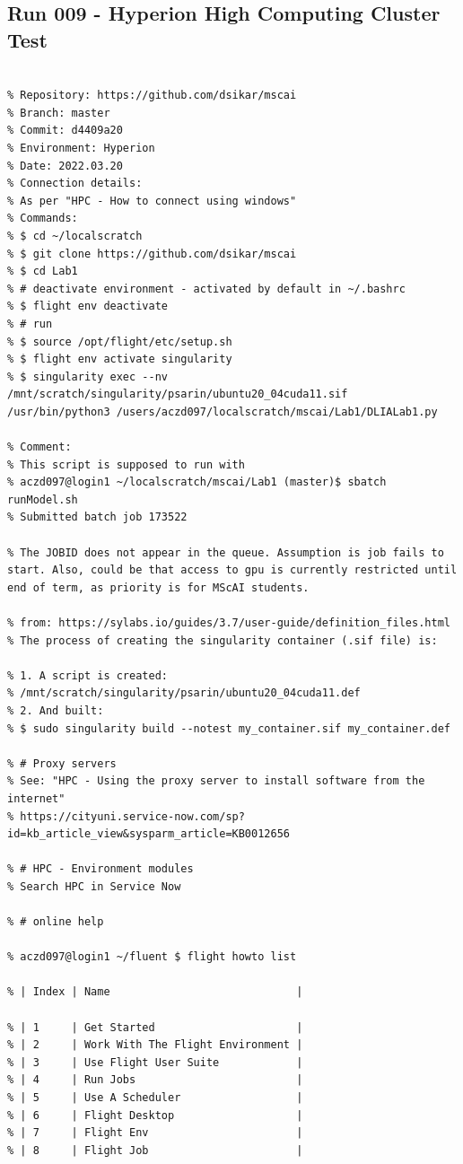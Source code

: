 \subsection{Run 009 - Hyperion High Computing Cluster Test}
\label{app_res:009}
\begin{verbatim}

% Repository: https://github.com/dsikar/mscai
% Branch: master
% Commit: d4409a20
% Environment: Hyperion
% Date: 2022.03.20
% Connection details:
% As per "HPC - How to connect using windows"
% Commands:
% $ cd ~/localscratch 
% $ git clone https://github.com/dsikar/mscai
% $ cd Lab1
% # deactivate environment - activated by default in ~/.bashrc
% $ flight env deactivate
% # run
% $ source /opt/flight/etc/setup.sh
% $ flight env activate singularity
% $ singularity exec --nv /mnt/scratch/singularity/psarin/ubuntu20_04cuda11.sif   /usr/bin/python3 /users/aczd097/localscratch/mscai/Lab1/DLIALab1.py

% Comment:
% This script is supposed to run with 
% aczd097@login1 ~/localscratch/mscai/Lab1 (master)$ sbatch runModel.sh
% Submitted batch job 173522

% The JOBID does not appear in the queue. Assumption is job fails to start. Also, could be that access to gpu is currently restricted until end of term, as priority is for MScAI students.

% from: https://sylabs.io/guides/3.7/user-guide/definition_files.html
% The process of creating the singularity container (.sif file) is:

% 1. A script is created:
% /mnt/scratch/singularity/psarin/ubuntu20_04cuda11.def
% 2. And built:
% $ sudo singularity build --notest my_container.sif my_container.def

% # Proxy servers
% See: "HPC - Using the proxy server to install software from the internet"
% https://cityuni.service-now.com/sp?id=kb_article_view&sysparm_article=KB0012656

% # HPC - Environment modules
% Search HPC in Service Now

% # online help

% aczd097@login1 ~/fluent $ flight howto list

% | Index | Name                             |

% | 1     | Get Started                      |
% | 2     | Work With The Flight Environment |
% | 3     | Use Flight User Suite            |
% | 4     | Run Jobs                         |
% | 5     | Use A Scheduler                  |
% | 6     | Flight Desktop                   |
% | 7     | Flight Env                       |
% | 8     | Flight Job                       |


\end{verbatim}
